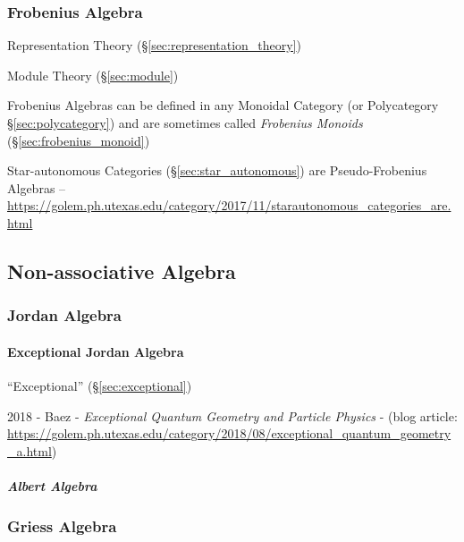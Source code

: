 {{\subsubsection{Frobenius Algebra}\label{sec:frobenius_algebra}

Representation Theory (\S\ref{sec:representation_theory})

Module Theory (\S\ref{sec:module})

Frobenius Algebras can be defined in any Monoidal Category (or
Polycategory \S\ref{sec:polycategory}) and are sometimes called
\emph{Frobenius Monoids} (\S\ref{sec:frobenius_monoid})

Star-autonomous Categories (\S\ref{sec:star_autonomous}) are Pseudo-Frobenius
Algebras
--\url{https://golem.ph.utexas.edu/category/2017/11/starautonomous_categories_are.html}



\subsection{Non-associative Algebra}
\label{sec:nonassociative_algebra}

\subsubsection{Jordan Algebra}\label{sec:jordan_algebra}

\paragraph{Exceptional Jordan Algebra}\label{sec:exceptional_jordan_algebra}
\hfill

``Exceptional'' (\S\ref{sec:exceptional})

2018 - Baez - \emph{Exceptional Quantum Geometry and Particle Physics} - (blog
article:
\url{https://golem.ph.utexas.edu/category/2018/08/exceptional_quantum_geometry_a.html})



\subparagraph{Albert Algebra}\label{sec:albert_algebra}\hfill



\subsubsection{Griess Algebra}\label{sec:griess_algebra}

}}
